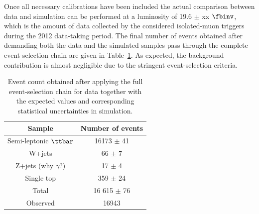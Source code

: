 Once all necessary calibrations have been included the actual comparison between data and simulation can be performed at a luminosity of 19.6 $\pm$ xx $\fbinv$, which is the amount of data collected by the considered isolated-muon triggers during the 2012 data-taking period.
The final number of events obtained after demanding both the data and the simulated samples pass through the complete event-selection chain are given in Table~\ref{table::DataMCComp}.
As expected, the background contribution is almost negligible due to the stringent event-selection criteria.
\begin{table}[h!t]
 \caption{Event count obtained after applying the full event-selection chain for data together with the expected values and corresponding statistical uncertainties in simulation.} \label{table::DataMCComp}
 \centering
 \begin{tabular}{c|c}
  \hline
  Sample 			& Number of events 	\\
  \hline
  \hline
  Semi-leptonic $\ttbar$ 	& 16173 $\pm$ 41 	\\
  W+jets 			& 66 $\pm$ 7		\\
  Z+jets (why $\gamma$?)	& 17 $\pm$ 4		\\
  Single top 			& 359 $\pm$ 24		\\
  \hline
  Total				& 16 615 $\pm$ 76	\\
  \hline
  \hline
  Observed			& 16943			\\
  \hline
 \end{tabular}
\end{table}

